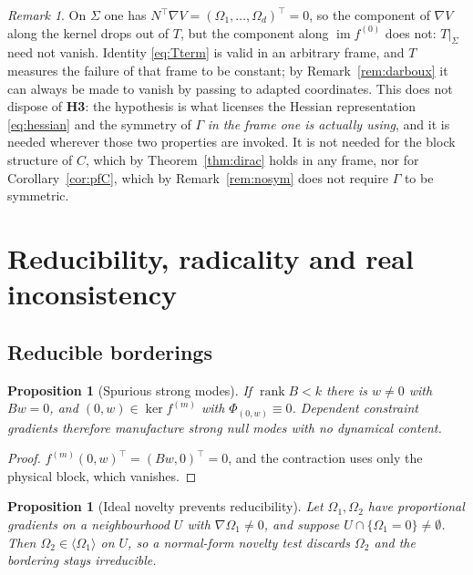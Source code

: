 \documentclass[12pt]{article}
\theoremstyle{plain}
\newtheorem{proposition}[theorem]{Proposition}
\theoremstyle{definition}
\theoremstyle{remark}
\newtheorem{remark}[theorem]{Remark}
\DeclareMathOperator{\rank}{rank}
\DeclareMathOperator{\im}{im}
\newcommand{\Om}{\Omega}
\newcommand{\gen}[1]{\langle #1\rangle}
\begin{document}
	\begin{remark}
		On $\Sigma$ one has $N^{\top}\nabla V=(\Om_{1},\dots,\Om_{d})^{\top}=0$, so the
		component of $\nabla V$ along the kernel drops out of $T$, but the component
		along $\im f^{(0)}$ does not: $T|_{\Sigma}$ need not vanish. Identity
		\eqref{eq:Tterm} is valid in an arbitrary frame, and $T$ measures the failure of
		that frame to be constant; by Remark~\ref{rem:darboux} it can always be made to
		vanish by passing to adapted coordinates. This does not dispose of \textbf{H3}:
		the hypothesis is what licenses the Hessian representation \eqref{eq:hessian}
		and the symmetry of $\Gamma$ \emph{in the frame one is actually using}, and it
		is needed wherever those two properties are invoked. It is not needed for the
		block structure of $C$, which by Theorem~\ref{thm:dirac} holds in any frame, nor
		for Corollary~\ref{cor:pfC}, which by Remark~\ref{rem:nosym} does not require
		$\Gamma$ to be symmetric.
	\end{remark}
	
	\section{Reducibility, radicality and real inconsistency}
	\label{sec:reducibility}
	
	\subsection{Reducible borderings}
	
	\begin{proposition}[Spurious strong modes]
		\label{prop:spurious}
		If $\rank B<k$ there is $w\neq0$ with $Bw=0$, and $(0,w)\in\ker f^{(m)}$ with
		$\Phi_{(0,w)}\equiv0$. Dependent constraint gradients therefore manufacture
		strong null modes with no dynamical content.
	\end{proposition}
	
	\begin{proof}
		$f^{(m)}(0,w)^{\top}=(Bw,0)^{\top}=0$, and the contraction uses only the
		physical block, which vanishes.
	\end{proof}
	
	\begin{proposition}[Ideal novelty prevents reducibility]
		\label{prop:novelty}
		Let $\Om_{1},\Om_{2}$ have proportional gradients on a neighbourhood $U$ with
		$\nabla\Om_{1}\neq0$, and suppose $U\cap\{\Om_{1}=0\}\neq\emptyset$. Then
		$\Om_{2}\in\gen{\Om_{1}}$ on $U$, so a normal-form novelty test discards
		$\Om_{2}$ and the bordering stays irreducible.
	\end{proposition}
	
\end{document}
